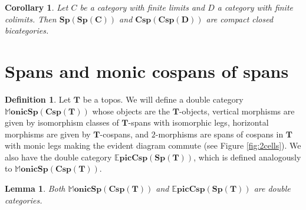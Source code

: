 \documentclass[11pt]{amsart}
\newcommand{\cat}[1]{\mathbf{#1}}
\newcommand{\bispsp}[1]{\mathbf{Sp(Sp(#1))}}
\newcommand{\bicspcsp}[1]{\mathbf{Csp(Csp(#1))}}
\newcommand{\dblmonspcsp}[1]{\mathbb{M}\mathbf{onicSp(Csp(#1))}}
\newcommand{\dblepiccspsp}[1]{\mathbb{E}\mathbf{picCsp(Sp(#1))}}
\newtheorem{lem}[thm]{Lemma}
\newtheorem{cor}[thm]{Corollary}
\theoremstyle{remark}
\theoremstyle{definition}
\newtheorem{defn}[thm]{Definition}
\begin{document}
\begin{cor}
	\label{cor:SpansSpansAreCCBicat}
	Let $C$ be a category with finite limits and $D$ a category with finite colimits. Then $\bispsp{C}$ and $\bicspcsp{D}$ are compact closed bicategories.
\end{cor}

\section{Spans and monic cospans of spans} %
\label{sec:SpansCospans}

\begin{defn}
\label{def:DblCatMonSpanCsp}
	Let $\cat{T}$ be a topos. We will define a double category $\dblmonspcsp{T}$ whose objects are the $\cat{T}$-objects, vertical morphisms are given by isomorphism classes of $\cat{T}$-spans with isomorphic legs, horizontal morphisms are given by $\cat{T}$-cospans, and $2$-morphisms are spans of cospans in $\cat{T}$ with monic legs making the evident diagram commute (see Figure \ref{fig:2cells}). We also have the double category $\dblepiccspsp{T}$, which is defined analogously to $\dblmonspcsp{T}$. 
\end{defn}

\begin{lem}
\label{lem:SpanCospanDoubleCat}
	Both $\dblmonspcsp{T}$ and $\dblepiccspsp{T}$ are double categories.  
\end{lem}
\end{document}
